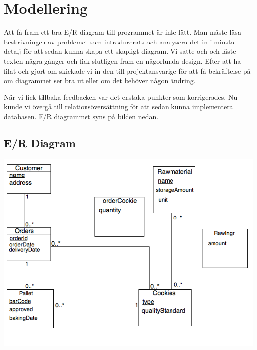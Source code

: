 \section{Modellering}

Att få fram ett bra E/R diagram till programmet är inte lätt. Man måste läsa beskrivningen av problemet som introducerats och analysera det in i minsta detalj för att sedan kunna skapa ett skapligt diagram. Vi satte och och läste texten några gånger och fick slutligen fram en någorlunda design. Efter att ha filat och gjort om skickade vi in den till projektansvarige för att få bekräftelse på om diagrammet ser bra ut eller om det behöver någon ändring. 

När vi fick tillbaka feedbacken var det enstaka punkter som korrigerades. Nu kunde vi övergå till relationsöversättning för att sedan kunna implementera databasen. E/R diagrammet syns på bilden nedan. 

\subsection{E/R Diagram}
\centerline{\includegraphics[scale = 0.6]{er.jpg}}